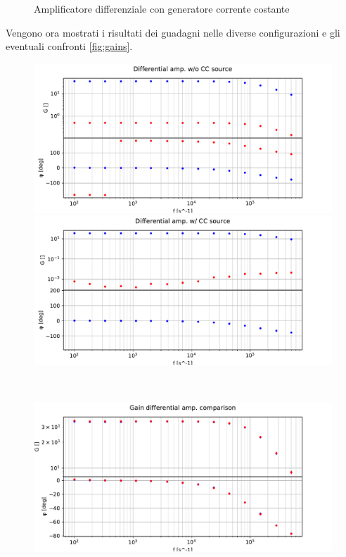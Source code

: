 \begin{figure}[h]
\begin{minipage}{0.49\textwidth}
        \caption{Amplificatore differenziale con gene\-ratore corrente costante}
        \label{fig:ampdiff_cc_circ}
    \end{minipage}
\end{figure}

Vengono ora mostrati i risultati dei guadagni nelle diverse configurazioni e gli eventuali confronti \ref{fig:gains}.

\begin{figure}[h]
    \centering
    \begin{minipage}{0.5\textwidth}
        \centering
        \includegraphics[width=\textwidth]{Figure_1.pdf} 
    \end{minipage}\hfill
    \begin{minipage}{0.5\textwidth}
        \centering
        \includegraphics[width=\textwidth]{Figure_2.pdf} 
    \end{minipage}
    \\
    \centering
    \begin{minipage}{0.5\textwidth}
        \centering
        \includegraphics[width=\textwidth]{Figure_3.pdf} 

\end{minipage}
\end{figure}
